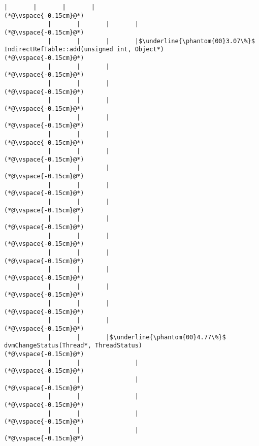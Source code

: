 \begin{lstlisting}[caption=Staattinen metodi Java$\to$C , label=profile:J2CBenchmark00001, numberbychapter=true, frame=lines, float, floatplacement=t]
            |       |       |       |
(*@\vspace{-0.15cm}@*)
            |       |       |       |
(*@\vspace{-0.15cm}@*)
            |       |       |       |$\underline{\phantom{00}3.07\%}$ IndirectRefTable::add(unsigned int, Object*)
(*@\vspace{-0.15cm}@*)
            |       |       |        
(*@\vspace{-0.15cm}@*)
            |       |       |        
(*@\vspace{-0.15cm}@*)
            |       |       |        
(*@\vspace{-0.15cm}@*)
            |       |       |        
(*@\vspace{-0.15cm}@*)
            |       |       |        
(*@\vspace{-0.15cm}@*)
            |       |       |        
(*@\vspace{-0.15cm}@*)
            |       |       |        
(*@\vspace{-0.15cm}@*)
            |       |       |        
(*@\vspace{-0.15cm}@*)
            |       |       |        
(*@\vspace{-0.15cm}@*)
            |       |       |        
(*@\vspace{-0.15cm}@*)
            |       |       |        
(*@\vspace{-0.15cm}@*)
            |       |       |        
(*@\vspace{-0.15cm}@*)
            |       |       |        
(*@\vspace{-0.15cm}@*)
            |       |       |        
(*@\vspace{-0.15cm}@*)
            |       |       |
(*@\vspace{-0.15cm}@*)
            |       |       |
(*@\vspace{-0.15cm}@*)
            |       |       |$\underline{\phantom{00}4.77\%}$ dvmChangeStatus(Thread*, ThreadStatus)
(*@\vspace{-0.15cm}@*)
            |       |               |
(*@\vspace{-0.15cm}@*)
            |       |               |
(*@\vspace{-0.15cm}@*)
            |       |               |
(*@\vspace{-0.15cm}@*)
            |       |               |
(*@\vspace{-0.15cm}@*)
            |       |               |
(*@\vspace{-0.15cm}@*)

\end{lstlisting}
